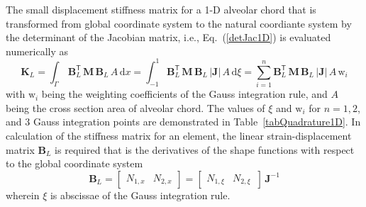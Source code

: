 The small displacement stiffness matrix for a 1-D alveolar chord that is transformed from global coordinate system to the natural coordiante system by the determinant of the Jacobian matrix, i.e., Eq.~(\ref{detJac1D}) is evaluated numerically as 
\begin{equation}
\mathbf{K}_{L} = \int_{\Gamma} \, \mathbf{B}_L^{\mathsf{T}} \, \mathbf{M} \, \mathbf{B}_L \, A \, \mathrm{d} x  = \int_{-1}^{1} \mathbf{B}_L^{\mathsf{T}} \, \mathbf{M} \, \mathbf{B}_L \, |\mathbf{J}|  \, A \,  \mathrm{d} \xi =  \sum_{i=1}^{n}  \mathbf{B}_L^{\mathsf{T}} \, \mathbf{M} \, \mathbf{B}_L \, |\mathbf{J}| \, A \, \mathrm{w}_i
\end{equation}
with $\mathrm{w}_i$ being the  weighting coefficients of the Gauss integration rule, and $A$ being the cross section area of alveolar chord. The values of $\xi$ and $\mathrm{w}_i$ for $n = 1, 2$, and $3$ Gauss integration points are demonstrated in Table~\ref{tabQuadrature1D}.
In calculation of the stiffness matrix for an element, the linear strain-displacement matrix $\mathbf{B}_L$ is required that is the derivatives of the shape functions with respect to the global coordinate system  
\begin{equation}
\mathbf{B}_L = \begin{bmatrix}
 N_{1,x} &   N_{2,x}
\end{bmatrix} = \begin{bmatrix}
 N_{1,\xi} &   N_{2,\xi} \, 
\end{bmatrix} \, \mathbf{J}^{-1}
\end{equation}
wherein $\xi$ is abscissae of the Gauss integration rule. 

